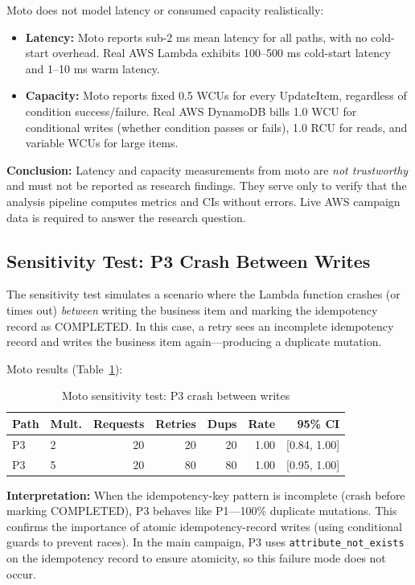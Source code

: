 Moto does not model latency or consumed capacity realistically:

\begin{itemize}
    \item \textbf{Latency:} Moto reports sub-2 ms mean latency for all paths, with no cold-start overhead. Real AWS Lambda exhibits 100--500 ms cold-start latency and 1--10 ms warm latency.
    \item \textbf{Capacity:} Moto reports fixed 0.5 WCUs for every UpdateItem, regardless of condition success/failure. Real AWS DynamoDB bills 1.0 WCU for conditional writes (whether condition passes or fails), 1.0 RCU for reads, and variable WCUs for large items.
\end{itemize}

\textbf{Conclusion:} Latency and capacity measurements from moto are \textit{not trustworthy} and must not be reported as research findings. They serve only to verify that the analysis pipeline computes metrics and CIs without errors. Live AWS campaign data is required to answer the research question.

\subsection{Sensitivity Test: P3 Crash Between Writes}

The sensitivity test simulates a scenario where the Lambda function crashes (or times out) \textit{between} writing the business item and marking the idempotency record as COMPLETED. In this case, a retry sees an incomplete idempotency record and writes the business item again---producing a duplicate mutation.

Moto results (Table~\ref{tab:moto_sensitivity}):

\begin{table}[h]
\centering
\caption{Moto sensitivity test: P3 crash between writes}
\label{tab:moto_sensitivity}
\begin{tabular}{llrrrrr}
\hline
\textbf{Path} & \textbf{Mult.} & \textbf{Requests} & \textbf{Retries} & \textbf{Dups} & \textbf{Rate} & \textbf{95\% CI} \\
\hline
P3 & 2 & 20 & 20 & 20 & 1.00 & [0.84, 1.00] \\
P3 & 5 & 20 & 80 & 80 & 1.00 & [0.95, 1.00] \\
\hline
\end{tabular}
\end{table}

\textbf{Interpretation:} When the idempotency-key pattern is incomplete (crash before marking COMPLETED), P3 behaves like P1---100\% duplicate mutations. This confirms the importance of atomic idempotency-record writes (using conditional guards to prevent races). In the main campaign, P3 uses \texttt{attribute\_not\_exists} on the idempotency record to ensure atomicity, so this failure mode does not occur.

